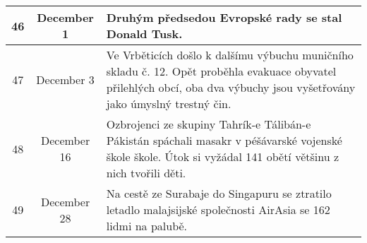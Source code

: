\begin{tabularx}{\linewidth}{@{}c @{}c X@{}}
46 & December 1 & Druhým předsedou Evropské rady se stal Donald Tusk. \\ \midrule
47 & December 3 & Ve Vrběticích došlo k dalšímu výbuchu muničního skladu č. 12. Opět proběhla evakuace obyvatel přilehlých obcí, oba dva výbuchy jsou vyšetřovány jako úmyslný trestný čin. \\ \midrule
48 & December 16 & Ozbrojenci ze skupiny Tahrík-e Tálibán-e Pákistán spáchali masakr v péšávarské vojenské škole škole. Útok si vyžádal 141 obětí většinu z nich tvořili děti. \\ \midrule
49 & December 28 & Na cestě ze Surabaje do Singapuru se ztratilo letadlo malajsijské společnosti AirAsia se 162 lidmi na palubě. \\

\bottomrule[1.25pt]
\end{tabularx}